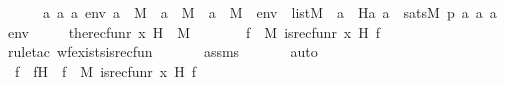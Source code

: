 \begin{isabellebody}
\ \ \ \ {\isachardoublequoteopen}\ {\isacharparenleft}{\kern0pt}{\isasymAnd}a{}\ a{}\ a{}\ env{\isachardot}{\kern0pt}\ a{}\ {\isasymin}\ M\ {\isasymLongrightarrow}\ a{}\ {\isasymin}\ M\ {\isasymLongrightarrow}\ a{}\ {\isasymin}\ M\ {\isasymLongrightarrow}\ env\ {\isasymin}\ list{\isacharparenleft}{\kern0pt}M{\isacharparenright}{\kern0pt}\ {\isasymLongrightarrow}\ a{}\ {\isacharequal}{\kern0pt}\ H{\isacharparenleft}{\kern0pt}a{}{\isacharcomma}{\kern0pt}\ a{}{\isacharparenright}{\kern0pt}\ {\isasymlongleftrightarrow}\ sats{\isacharparenleft}{\kern0pt}M{\isacharcomma}{\kern0pt}\ p{\isacharcomma}{\kern0pt}\ {\isacharbrackleft}{\kern0pt}a{}{\isacharcomma}{\kern0pt}\ a{}{\isacharcomma}{\kern0pt}\ a{}{\isacharbrackright}{\kern0pt}\ {\isacharat}{\kern0pt}\ env{\isacharparenright}{\kern0pt}{\isacharparenright}{\kern0pt}{\isachardoublequoteclose}\ \ \isanewline
\ \ \ {\isachardoublequoteopen}the{\isacharunderscore}{\kern0pt}recfun{\isacharparenleft}{\kern0pt}r{\isacharcomma}{\kern0pt}\ x{\isacharcomma}{\kern0pt}\ H{\isacharparenright}{\kern0pt}\ {\isasymin}\ M{\isachardoublequoteclose}\ \isanewline
%
\isadelimproof
%
\endisadelimproof
%
\isatagproof
{}\isamarkupfalse%
\ {\isacharminus}{\kern0pt}\ \isanewline
\ \ \isamarkupfalse%
\ {\isachardoublequoteopen}{\isasymexists}f\ {\isasymin}\ M{\isachardot}{\kern0pt}\ is{\isacharunderscore}{\kern0pt}recfun{\isacharparenleft}{\kern0pt}r{\isacharcomma}{\kern0pt}\ x{\isacharcomma}{\kern0pt}\ H{\isacharcomma}{\kern0pt}\ f{\isacharparenright}{\kern0pt}{\isachardoublequoteclose}\ \isanewline
\ \ \ \ \isamarkupfalse%
{\isacharparenleft}{\kern0pt}rule{\isacharunderscore}{\kern0pt}tac\ wf{\isacharunderscore}{\kern0pt}exists{\isacharunderscore}{\kern0pt}is{\isacharunderscore}{\kern0pt}recfun{\isacharprime}{\kern0pt}{\isacharparenright}{\kern0pt}\ \isanewline
\ \ \ \ \isamarkupfalse%
\ assms\ \isanewline
\ \ \ \ \isamarkupfalse%
\ auto\ \isanewline
\ \ \isamarkupfalse%
\ \isamarkupfalse%
\ f\ \ fH\ {\isacharcolon}{\kern0pt}\ {\isachardoublequoteopen}f\ {\isasymin}\ M{\isachardoublequoteclose}\ {\isachardoublequoteopen}is{\isacharunderscore}{\kern0pt}recfun{\isacharparenleft}{\kern0pt}r{\isacharcomma}{\kern0pt}\ x{\isacharcomma}{\kern0pt}\ H{\isacharcomma}{\kern0pt}\ f{\isacharparenright}{\kern0pt}{\isachardoublequoteclose}\ \isamarkupfalse%

\end{isabellebody}

